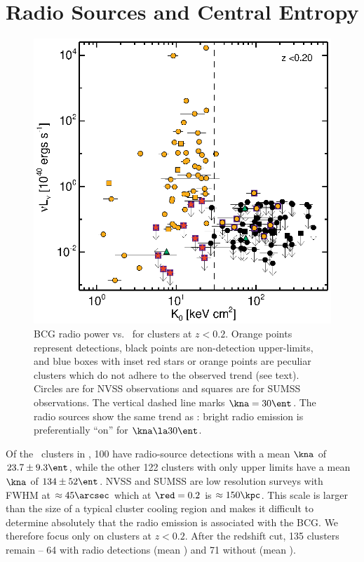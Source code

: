 \documentclass{emulateapj}
\begin{document}
\section{Radio Sources and Central Entropy}
\label{sec:agn}

\begin{figure}
  \begin{center}
    \includegraphics*[width=\columnwidth, trim=28mm 7mm 40mm 17mm,
      clip]{radio_zcut}
    \caption{BCG radio power vs. \kna\ for clusters at $z <
      0.2$. Orange points represent detections, black points are
      non-detection upper-limits, and blue boxes with inset red stars
      or orange points are peculiar clusters which do not adhere to
      the observed trend (see text). Circles are for NVSS observations
      and squares are for SUMSS observations. The vertical dashed line
      marks $\kna = 30 \ent$. The radio sources show the same trend as
      \halpha: bright radio emission is preferentially ``on'' for
      $\kna \la 30 \ent$.}
    \label{fig:radzcut}
  \end{center}
\end{figure}

Of the \clnum\ clusters in \accept, 100 have radio-source detections
with a mean $\kna$ of $23.7 \pm 9.3 \ent$, while the other 122
clusters with only upper limits have a mean $\kna$ of $134 \pm 52
\ent$. NVSS and SUMSS are low resolution surveys with FWHM at $\approx
45\arcsec$ which at $\red = 0.2$ is $\approx 150\kpc$. This scale is
larger than the size of a typical cluster cooling region and makes it
difficult to determine absolutely that the radio emission is
associated with the BCG. We therefore focus only on clusters at $z <
0.2$. After the redshift cut, 135 clusters remain -- 64 with radio
detections (mean \frad) and 71 without (mean \nfrad).
\end{document}
